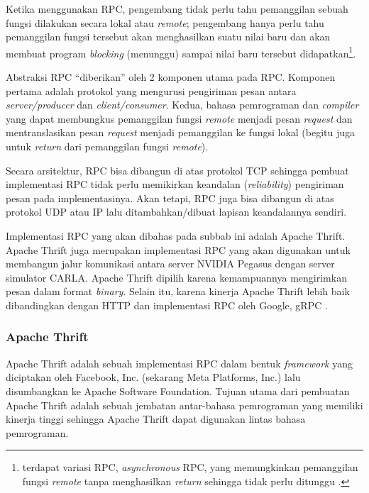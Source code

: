 Ketika menggunakan RPC, pengembang tidak perlu tahu pemanggilan sebuah fung\-si
dilakukan secara lokal atau \textit{remote}; pengembang hanya perlu tahu
pemanggilan fungsi tersebut akan menghasilkan suatu nilai baru dan akan membuat
program \textit{blocking} (menunggu) sampai nilai baru tersebut
didapatkan\footnote{terdapat variasi RPC, \textit{asynchronous} RPC, yang
    memungkinkan pemanggilan fungsi \textit{remote} tanpa menghasilkan
    \textit{return} sehingga tidak perlu ditunggu \parencite{tanenbaum_distSys}.}.

Abstraksi RPC ``diberikan'' oleh 2 komponen utama pada RPC. Komponen pertama
adalah protokol yang mengurusi pengiriman pesan antara \textit{server/producer}
dan \textit{client/consumer}. Kedua, bahasa pemrograman dan \textit{compiler}
yang dapat membungkus pemanggilan fungsi \textit{remote} menjadi pesan
\textit{request} dan mentranslasikan pesan \textit{request} menjadi pemanggilan
ke fungsi lokal (begitu juga untuk \textit{return} dari pemanggilan fungsi
\textit{remote}).

Secara arsitektur, RPC bisa dibangun di atas protokol TCP sehingga pembuat
implementasi RPC tidak perlu memikirkan keandalan (\textit{reliability})
pengiriman pesan pada implementasinya. Akan tetapi, RPC juga bisa dibangun di
atas protokol UDP atau IP lalu ditambahkan/dibuat lapisan keandalannya sendiri.

Implementasi RPC yang akan dibahas pada subbab ini adalah Apache Thrift.
Apa\-che Thrift juga merupakan implementasi RPC yang akan digunakan untuk
membangun jalur komunikasi antara server NVIDIA Pegasus dengan server simulator
CARLA. Apache Thrift dipilih karena kemampuannya mengirimkan pesan dalam format
\textit{binary}. Selain itu, karena kinerja Apache Thrift lebih baik
dibandingkan dengan HTTP dan implementasi RPC oleh Google, gRPC
\parencite{abernethy_buildingHighPerformanceMSThrift}.

\subsubsection{Apache Thrift}

Apache Thrift adalah sebuah implementasi RPC dalam bentuk \textit{framework}
yang diciptakan oleh Facebook, Inc. (sekarang Meta Platforms, Inc.) lalu
disumbangkan ke Apache Software Foundation. Tujuan utama dari pembuatan Apache
Thrift adalah sebuah jembatan antar-bahasa pemrograman yang memiliki kinerja
tinggi \parencite{agarwal_thrift} sehingga Apache Thrift dapat digunakan lintas
bahasa pemrograman.

